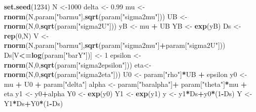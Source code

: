 \documentclass[]{book}
\newenvironment{Shaded}{\begin{snugshade}}{\end{snugshade}}
\newcommand{\DecValTok}[1]{\textcolor[rgb]{0.00,0.00,0.81}{#1}}
\newcommand{\FloatTok}[1]{\textcolor[rgb]{0.00,0.00,0.81}{#1}}
\newcommand{\KeywordTok}[1]{\textcolor[rgb]{0.13,0.29,0.53}{\textbf{#1}}}
\newcommand{\NormalTok}[1]{#1}
\newcommand{\OperatorTok}[1]{\textcolor[rgb]{0.81,0.36,0.00}{\textbf{#1}}}
\newcommand{\StringTok}[1]{\textcolor[rgb]{0.31,0.60,0.02}{#1}}
\theoremstyle{definition}
\theoremstyle{definition}
\theoremstyle{definition}
\theoremstyle{remark}
\begin{document}
\begin{Shaded}
\begin{Highlighting}[]
\KeywordTok{set.seed}\NormalTok{(}\DecValTok{1234}\NormalTok{)}
\NormalTok{N <-}\DecValTok{1000}
\NormalTok{delta <-}\StringTok{ }\FloatTok{0.99}
\NormalTok{mu <-}\StringTok{ }\KeywordTok{rnorm}\NormalTok{(N,param[}\StringTok{"barmu"}\NormalTok{],}\KeywordTok{sqrt}\NormalTok{(param[}\StringTok{"sigma2mu"}\NormalTok{]))}
\NormalTok{UB <-}\StringTok{ }\KeywordTok{rnorm}\NormalTok{(N,}\DecValTok{0}\NormalTok{,}\KeywordTok{sqrt}\NormalTok{(param[}\StringTok{"sigma2U"}\NormalTok{]))}
\NormalTok{yB <-}\StringTok{ }\NormalTok{mu }\OperatorTok{+}\StringTok{ }\NormalTok{UB }
\NormalTok{YB <-}\StringTok{ }\KeywordTok{exp}\NormalTok{(yB)}
\NormalTok{Ds <-}\StringTok{ }\KeywordTok{rep}\NormalTok{(}\DecValTok{0}\NormalTok{,N)}
\NormalTok{V <-}\StringTok{ }\KeywordTok{rnorm}\NormalTok{(N,param[}\StringTok{"barmu"}\NormalTok{],}\KeywordTok{sqrt}\NormalTok{(param[}\StringTok{"sigma2mu"}\NormalTok{]}\OperatorTok{+}\NormalTok{param[}\StringTok{"sigma2U"}\NormalTok{]))}
\NormalTok{Ds[V}\OperatorTok{<=}\KeywordTok{log}\NormalTok{(param[}\StringTok{"barY"}\NormalTok{])] <-}\StringTok{ }\DecValTok{1} 
\NormalTok{epsilon <-}\StringTok{ }\KeywordTok{rnorm}\NormalTok{(N,}\DecValTok{0}\NormalTok{,}\KeywordTok{sqrt}\NormalTok{(param[}\StringTok{"sigma2epsilon"}\NormalTok{]))}
\NormalTok{eta<-}\StringTok{ }\KeywordTok{rnorm}\NormalTok{(N,}\DecValTok{0}\NormalTok{,}\KeywordTok{sqrt}\NormalTok{(param[}\StringTok{"sigma2eta"}\NormalTok{]))}
\NormalTok{U0 <-}\StringTok{ }\NormalTok{param[}\StringTok{"rho"}\NormalTok{]}\OperatorTok{*}\NormalTok{UB }\OperatorTok{+}\StringTok{ }\NormalTok{epsilon}
\NormalTok{y0 <-}\StringTok{ }\NormalTok{mu }\OperatorTok{+}\StringTok{  }\NormalTok{U0 }\OperatorTok{+}\StringTok{ }\NormalTok{param[}\StringTok{"delta"}\NormalTok{]}
\NormalTok{alpha <-}\StringTok{ }\NormalTok{param[}\StringTok{"baralpha"}\NormalTok{]}\OperatorTok{+}\StringTok{  }\NormalTok{param[}\StringTok{"theta"}\NormalTok{]}\OperatorTok{*}\NormalTok{mu }\OperatorTok{+}\StringTok{ }\NormalTok{eta}
\NormalTok{y1 <-}\StringTok{ }\NormalTok{y0}\OperatorTok{+}\NormalTok{alpha}
\NormalTok{Y0 <-}\StringTok{ }\KeywordTok{exp}\NormalTok{(y0)}
\NormalTok{Y1 <-}\StringTok{ }\KeywordTok{exp}\NormalTok{(y1)}
\NormalTok{y <-}\StringTok{ }\NormalTok{y1}\OperatorTok{*}\NormalTok{Ds}\OperatorTok{+}\NormalTok{y0}\OperatorTok{*}\NormalTok{(}\DecValTok{1}\OperatorTok{-}\NormalTok{Ds)}
\NormalTok{Y <-}\StringTok{ }\NormalTok{Y1}\OperatorTok{*}\NormalTok{Ds}\OperatorTok{+}\NormalTok{Y0}\OperatorTok{*}\NormalTok{(}\DecValTok{1}\OperatorTok{-}\NormalTok{Ds)}
\end{Highlighting}
\end{Shaded}
\end{document}
